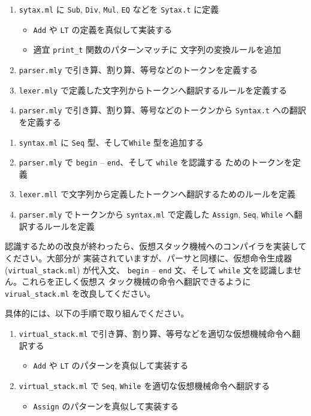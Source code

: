 \documentclass[a4paper,11pt]{jsarticle}
\begin{document}
\begin{enumerate}
\item \verb|sytax.ml| に \verb|Sub|, \verb|Div|, \verb|Mul|, \verb|EQ| などを
  \verb|Sytax.t| に定義
  \begin{itemize}
  \item \verb|Add| や \verb|LT| の定義を真似して実装する
  \item 適宜 \verb|print_t| 関数のパターンマッチに 文字列の変換ルールを追加
  \end{itemize}
\item \verb|parser.mly| で引き算、割り算、等号などのトークンを定義する
\item \verb|lexer.mly| で定義した文字列からトークンへ翻訳するルールを定義する
\item \verb|parser.mly| で引き算、割り算、等号などのトークンから \verb|Syntax.t| への翻訳
  を定義する
\end{enumerate}

\noindent{}

\begin{enumerate}
\item \verb|syntax.ml| に \verb|Seq| 型、そして\verb|While| 型を追加する
\item \verb|parser.mly| で \verb|begin| -- \verb|end|、そして \verb|while| を認識する
  ためのトークンを定義
\item \verb|lexer.mll| で文字列から定義したトークンへ翻訳するためのルールを定義
\item \verb|parser.mly| でトークンから \verb|syntax.ml| で定義した \verb|Assign|,
  \verb|Seq|, \verb|While| へ翻訳するルールを定義
\end{enumerate}

\noindent{}

認識するための改良が終わったら、仮想スタック機械へのコンパイラを実装してください。大部分が
実装されていますが、パーサと同様に、仮想命令生成器 (\verb|virtual_stack.ml|) が代入文、
\verb|begin| -- \verb|end| 文、そして \verb|while| 文を認識しません。これらを正しく仮想ス
タック機械の命令へ翻訳できるように \verb|virual_stack.ml| を改良してください。

具体的には、以下の手順で取り組んでください。

\begin{enumerate}
\item \verb|virtual_stack.ml| で引き算、割り算、等号などを適切な仮想機械命令へ翻訳する
  \begin{itemize}
  \item \verb|Add| や \verb|LT| のパターンを真似して実装する
  \end{itemize}
\item \verb|virtual_stack.ml| で \verb|Seq|, \verb|While| を適切な仮想機械命令へ翻訳する
  \begin{itemize}
  \item \verb|Assign| のパターンを真似して実装する
  \end{itemize}
\end{enumerate}
\end{document}
